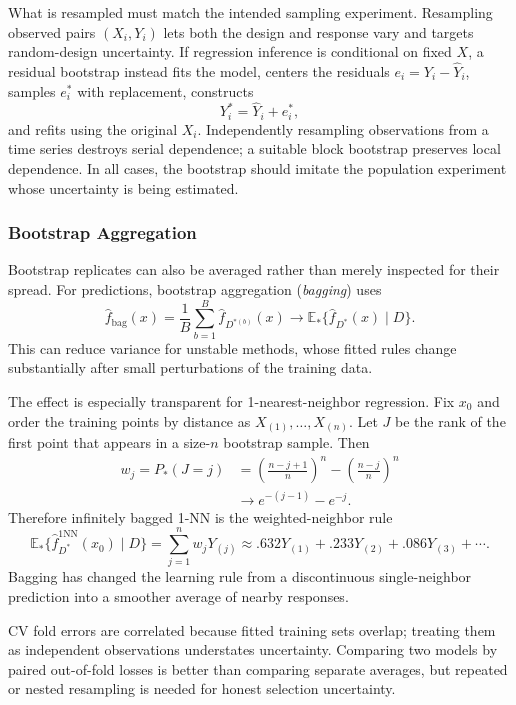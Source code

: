 \documentclass[12pt,oneside]{book}
\numberwithin{equation}{section}
\theoremstyle{definition}
\theoremstyle{plain}
\theoremstyle{remark}
\newcommand{\E}{\mathbb{E}}
\begin{document}
What is resampled must match the intended sampling experiment. Resampling
observed pairs $(X_i,Y_i)$ lets both the design and response vary and targets
random-design uncertainty. If regression inference is conditional on fixed
$X$, a residual bootstrap instead fits the model, centers the residuals
$e_i=Y_i-\widehat Y_i$, samples $e_i^*$ with replacement, constructs
\[
 Y_i^*=\widehat Y_i+e_i^*,
\]
and refits using the original $X_i$. Independently resampling observations
from a time series destroys serial dependence; a suitable block bootstrap
preserves local dependence. In all cases, the bootstrap should imitate the
population experiment whose uncertainty is being estimated.

\subsubsection{Bootstrap Aggregation}

Bootstrap replicates can also be averaged rather than merely inspected for
their spread. For predictions, bootstrap aggregation (\emph{bagging}) uses
\[
 \widehat f_{\mathrm{bag}}(x)
 =\frac1B\sum_{b=1}^B\widehat f_{D^{*(b)}}(x)
 \longrightarrow
 \E_*\{\widehat f_{D^*}(x)\mid D\}.
\]
This can reduce variance for unstable methods, whose fitted rules change
substantially after small perturbations of the training data.

The effect is especially transparent for 1-nearest-neighbor regression. Fix
$x_0$ and order the training points by distance as
$X_{(1)},\ldots,X_{(n)}$. Let $J$ be the rank of the first point that appears
in a size-$n$ bootstrap sample. Then
\begin{align*}
 w_j=P_*(J=j)
 &=\left(\frac{n-j+1}{n}\right)^n
   -\left(\frac{n-j}{n}\right)^n\\
 &\longrightarrow e^{-(j-1)}-e^{-j}.
\end{align*}
Therefore infinitely bagged 1-NN is the weighted-neighbor rule
\[
 \E_*\{\widehat f^{\mathrm{1NN}}_{D^*}(x_0)\mid D\}
 =\sum_{j=1}^n w_jY_{(j)}
 \approx .632Y_{(1)}+.233Y_{(2)}+.086Y_{(3)}+\cdots.
\]
Bagging has changed the learning rule from a discontinuous single-neighbor
prediction into a smoother average of nearby responses.

CV fold errors are correlated because fitted training sets overlap; treating
them as independent observations understates uncertainty. Comparing two
models by paired out-of-fold losses is better than comparing separate averages,
but repeated or nested resampling is needed for honest selection uncertainty.
\end{document}

